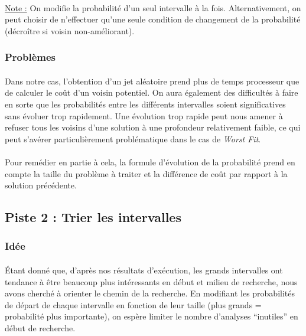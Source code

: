 \documentclass[a4paper,10pt]{report}
\begin{document}
\paragraph{}
\underline{Note :} On modifie la probabilité d'un seul intervalle à la fois. Alternativement, on peut choisir
de n'effectuer qu'une seule condition de changement de la probabilité (décroître si voisin non-améliorant).



\subsubsection{Problèmes}

\paragraph{}
  Dans notre cas, l'obtention d'un jet aléatoire prend plus de temps processeur que de calculer le coût d'un
voisin potentiel. On aura également des difficultés à faire en sorte que les probabilités entre les différents
intervalles soient significatives sans évoluer trop rapidement. Une évolution trop rapide peut nous amener à
refuser tous les voisins d'une solution à une profondeur relativement faible, ce qui peut s'avérer particulièrement
problématique dans le cas de \textit{Worst Fit}.
\paragraph{}
  Pour remédier en partie à cela, la formule d'évolution de la probabilité prend en compte la taille du problème
à traiter et la différence de coût par rapport à la solution précédente.

\pagebreak
\subsection{Piste 2 : Trier les intervalles}
\subsubsection{Idée}

\paragraph{}
  Étant donné que, d'après nos résultats d'exécution, les grands intervalles ont tendance à être beaucoup plus
intéressants en début et milieu de recherche, nous avons cherché à orienter le chemin de la recherche. En
modifiant les probabilités de départ de chaque intervalle en fonction de leur taille (plus grands = probabilité
plus importante), on espère limiter le nombre d'analyses ``inutiles'' en début de recherche.
\end{document}
